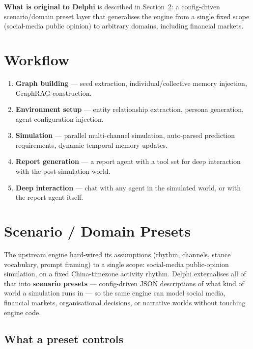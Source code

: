 \documentclass[11pt,a4paper]{article}
\begin{document}
\textbf{What is original to Delphi} is described in Section~\ref{sec:presets}:
a config-driven scenario/domain preset layer that generalises the engine from a
single fixed scope (social-media public opinion) to arbitrary domains, including
financial markets.

\section{Workflow}

\begin{enumerate}[nosep]
  \item \textbf{Graph building} --- seed extraction, individual/collective
    memory injection, GraphRAG construction.
  \item \textbf{Environment setup} --- entity relationship extraction, persona
    generation, agent configuration injection.
  \item \textbf{Simulation} --- parallel multi-channel simulation, auto-parsed
    prediction requirements, dynamic temporal memory updates.
  \item \textbf{Report generation} --- a report agent with a tool set for deep
    interaction with the post-simulation world.
  \item \textbf{Deep interaction} --- chat with any agent in the simulated
    world, or with the report agent itself.
\end{enumerate}

\section{Scenario / Domain Presets}
\label{sec:presets}

The upstream engine hard-wired its assumptions (rhythm, channels, stance
vocabulary, prompt framing) to a single scope: social-media public-opinion
simulation, on a fixed China-timezone activity rhythm. Delphi externalises all of
that into \textbf{scenario presets} --- config-driven JSON descriptions of what
kind of world a simulation runs in --- so the same engine can model social media,
financial markets, organisational decisions, or narrative worlds without
touching engine code.

\subsection{What a preset controls}
\end{document}

